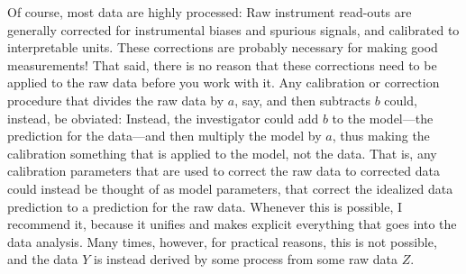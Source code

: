 \documentclass{article}
\begin{document}
Of course, most data are highly processed: Raw instrument read-outs are generally corrected for instrumental biases and spurious signals, and calibrated to interpretable units.
These corrections are probably necessary for making good measurements!
That said, there is no reason that these corrections need to be applied to the raw data before you work with it.
Any calibration or correction procedure that divides the raw data by $a$, say, and then subtracts $b$ could, instead, be obviated:
Instead, the investigator could add $b$ to the model---the prediction for the data---and then multiply the model by $a$, thus making the calibration something that is applied to the model, not the data.
That is, any calibration parameters that are used to correct the raw data to corrected data could instead be thought of as model parameters, that correct the idealized data prediction to a prediction for the raw data.
Whenever this is possible, I recommend it, because it unifies and makes explicit everything that goes into the data analysis.
Many times, however, for practical reasons, this is not possible, and the data $Y$ is instead derived by some process from some raw data $Z$.
\end{document}
